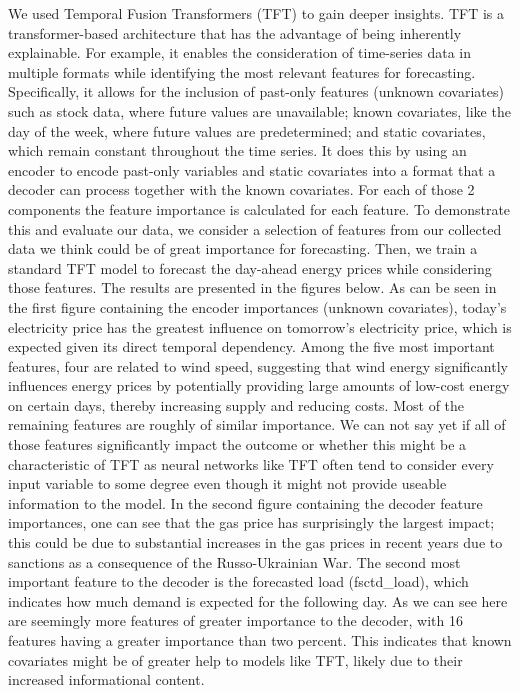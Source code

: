 \documentclass[a4paper]{article}
\begin{document}
We used Temporal Fusion Transformers (TFT) to gain deeper insights. TFT
is a transformer-based architecture that has the advantage of being
inherently explainable. For example, it enables the consideration of
time-series data in multiple formats while identifying the most relevant
features for forecasting. Specifically, it allows for the inclusion of
past-only features (unknown covariates) such as stock data, where future
values are unavailable; known covariates, like the day of the week,
where future values are predetermined; and static covariates, which
remain constant throughout the time series. It does this by using an
encoder to encode past-only variables and static covariates into a
format that a decoder can process together with the known covariates.
For each of those 2 components the feature importance is calculated for
each feature. To demonstrate this and evaluate our data, we consider a
selection of features from our collected data we think could be of great
importance for forecasting. Then, we train a standard TFT model to
forecast the day-ahead energy prices while considering those features.
The results are presented in the figures below. As can be seen in the
first figure containing the encoder importances (unknown covariates),
today's electricity price has the greatest influence on tomorrow's
electricity price, which is expected given its direct temporal
dependency. Among the five most important features, four are related to
wind speed, suggesting that wind energy significantly influences energy
prices by potentially providing large amounts of low-cost energy on
certain days, thereby increasing supply and reducing costs. Most of the
remaining features are roughly of similar importance. We can not say yet
if all of those features significantly impact the outcome or whether
this might be a characteristic of TFT as neural networks like TFT often
tend to consider every input variable to some degree even though it
might not provide useable information to the model. In the second figure
containing the decoder feature importances, one can see that the gas
price has surprisingly the largest impact; this could be due to
substantial increases in the gas prices in recent years due to sanctions
as a consequence of the Russo-Ukrainian War. The second most important
feature to the decoder is the forecasted load (fsctd\_load), which
indicates how much demand is expected for the following day. As we can
see here are seemingly more features of greater importance to the
decoder, with 16 features having a greater importance than two percent.
This indicates that known covariates might be of greater help to models
like TFT, likely due to their increased informational content.
\end{document}
